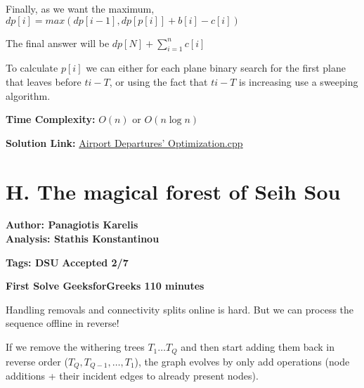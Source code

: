 \documentclass{article}
\begin{document}
\noindent Finally, as we want the maximum, $dp[i] = max(dp[i-1], dp[p[i]]+b[i]-c[i])$

\vspace{1em}

\noindent The final answer will be $dp[N] +  \sum_{i=1}^{n} c[i]$

\vspace{1em}

\noindent To calculate $p[i]$ we can either for each plane binary search for the first plane that leaves before $ti-T$, or using the fact that $ti-T$ is increasing use a sweeping algorithm.

\vspace{1em}

\noindent \textbf{Time Complexity:}
$O(n)$ or $O(n\log n)$

\vspace{1em}
\noindent \textbf{Solution Link:} 
    \href{https://github.com/StathisKons/GRCPC-2024-Editorial-Implementations/blob/main/G.%20Airport%20Departures%E2%80%99%20Optimization.cpp}{Airport Departures’ Optimization.cpp}

\newpage
\vspace{5em}

\section*{H. The magical forest of Seih Sou}

    \textbf{Author: Panagiotis Karelis}\\
    \textbf{Analysis: Stathis Konstantinou}
    
    \vspace{2em}
    \noindent \textbf{Tags: DSU} 
    \hfill \textbf{Accepted 2/7}
    
    \hfill \textbf{First Solve  GeeksforGreeks 110 minutes}
    
    \vspace{2em}
    
    
    \noindent
        Handling removals and connectivity splits online is hard. But we can process the sequence offline in reverse!
    
    \vspace{0.5em}
    
    \noindent
        If we remove the withering trees $ T_1 \dots T_Q $  and then start adding them back in reverse order ($ T_Q, T_{Q-1},\dots, T_1 $), the graph evolves by only add operations (node additions + their incident edges to already present nodes).
        
\end{document}
